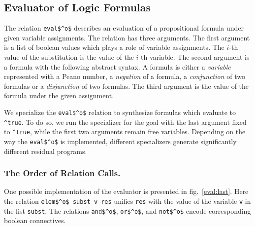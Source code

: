 \subsection{Evaluator of Logic Formulas}

The relation \lstinline{eval$^o$} describes an evaluation of a propositional formula under given variable assignments.
The relation has three arguments. The first argument is a list of boolean values which plays a role of variable assignments.
The $i$-th value of the substitution is the value of the $i$-th variable.
The second argument is a formula with the following abstract syntax.
A formula is either a \emph{variable} represented with a Peano number, a \emph{negation} of a formula, a \emph{conjunction} of two formulas or a \emph{disjunction} of two formulas.
The third argument is the value of the formula under the given assignment.

We specialize the \lstinline{eval$^o$} relation to synthesize formulas which evaluate to \lstinline{^true}.
To do so, we run the specializer for the goal with the last argument fixed to \lstinline{^true}, while the first two arguments remain free variables.
Depending on the way the \lstinline{eval$^o$} is implemented, different specializers generate significantly different residual programs.

\subsubsection{The Order of Relation Calls.}

One possible implementation of the evaluator is presented in fig.~\ref{eval:last}.
Here the relation \lstinline{elem$^o$ subst v res} unifies \lstinline{res} with the value of the variable \lstinline{v} in the list \lstinline{subst}.
The relations \lstinline{and$^o$}, \lstinline{or$^o$}, and \lstinline{not$^o$} encode corresponding boolean connectives.


